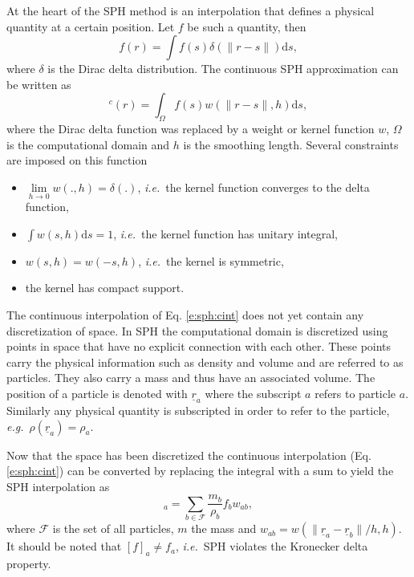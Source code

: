 \documentclass[12pt]{memoir}
\newcommand{\uvec}[1]{\underline{#1}}
\newcommand{\td}{\text{d}}
\newcommand{\ie}{\textit{i.e.}~}
\newcommand{\eg}{\textit{e.g.}~}
\begin{document}
At the heart of the SPH method is an interpolation that defines a
physical quantity at a certain position. Let $f$ be such a quantity,
then
\begin{equation}
f(r) = \int f(s) \delta(\|r-s\|) \td s,
\label{e:sph:delta}
\end{equation}
where $\delta$ is the Dirac delta distribution. The continuous SPH
approximation can be written as
\begin{equation}
[f]^c(r) = \int_\Omega f(s) w(\|r-s\|,h) \td s,
\label{e:sph:cint}
\end{equation}
where the Dirac delta function was replaced by a weight or kernel
function $w$, $\Omega$ is the computational domain and $h$ is the
smoothing length. Several constraints are imposed on this function
\begin{itemize}
\item $\underset{h\rightarrow 0}{\lim} w(.,h) = \delta(.)$, \ie the
kernel function converges to the delta function,
\item $\int w(s,h) \td s = 1$, \ie the kernel function has unitary
integral,
\item $w(s,h) = w(-s,h)$, \ie the kernel is symmetric,
\item the kernel has compact support.
\end{itemize}
The continuous interpolation of Eq. \eqref{e:sph:cint} does not yet
contain any discretization of space. In SPH the computational domain is
discretized using points in space that have no explicit connection with
each other. These points carry the physical information such as density
and volume and are referred to as particles. They also carry a mass and
thus have an associated volume. The position of a particle is denoted
with $\uvec{r}_a$ where the subscript $a$ refers to particle $a$.
Similarly any physical quantity is subscripted in order to refer to the
particle, \eg $\rho(\uvec{r}_a) = \rho_a$.

Now that the space has been discretized the continuous interpolation
(Eq. \eqref{e:sph:cint}) can be converted by replacing the integral with
a sum to yield the SPH interpolation as
\begin{equation}
[f]_a = \underset{b \in \mathcal{F}}{\sum} \frac{m_b}{\rho_b} f_b w_{ab},
\label{e:sph:int}
\end{equation}
where $\mathcal{F}$ is the set of all particles, $m$ the mass and
$w_{ab} = w(\|\uvec{r}_a - \uvec{r}_b\|/h, h)$. It should be noted that
$[f]_a \neq f_a$, \ie SPH violates the Kronecker delta property.
\end{document}

